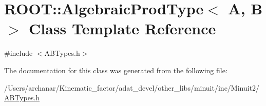 \hypertarget{classROOT_1_1Minuit2_1_1AlgebraicProdType}{}\section{R\+O\+OT\+:\+:Algebraic\+Prod\+Type$<$ A, B $>$ Class Template Reference}
\label{classROOT_1_1Minuit2_1_1AlgebraicProdType}


{\ttfamily \#include $<$A\+B\+Types.\+h$>$}



The documentation for this class was generated from the following file\+:\begin{DoxyCompactItemize}
\item 
/\+Users/archanar/\+Kinematic\+\_\+factor/adat\+\_\+devel/other\+\_\+libs/minuit/inc/\+Minuit2/\mbox{\hyperlink{other__libs_2minuit_2inc_2Minuit2_2ABTypes_8h}{A\+B\+Types.\+h}}\end{DoxyCompactItemize}
